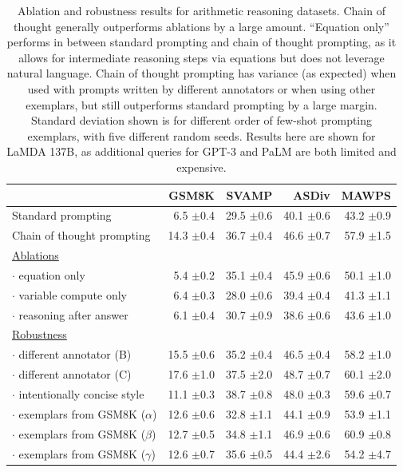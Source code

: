 \documentclass[]{article}
\theoremstyle{plain}
\theoremstyle{definition}
\theoremstyle{remark}
\newcommand{\lamda}[0]{LaMDA}
\newcommand{\palm}[0]{PaLM}
\newcommand{\cell}[2]{#1{ \scriptsize $\pm$#2}}
\begin{document}
\clearpage
\begingroup
{}
\begin{table}[h]
    \centering
    \caption{
    Ablation and robustness results for arithmetic reasoning datasets.
    Chain of thought generally outperforms ablations by a large amount. ``Equation only'' performs in between standard prompting and chain of thought prompting, as it allows for intermediate reasoning steps via equations but does not leverage natural language.
    Chain of thought prompting has variance (as expected) when used with prompts written by different annotators or when using other exemplars, but still outperforms standard prompting by a large margin.
    Standard deviation shown is for different order of few-shot prompting exemplars, with five different random seeds.
    Results here are shown for \lamda{} 137B, as additional queries for GPT-3 and \palm{} are both limited and expensive.
    }
    \begin{tabular}{l rrrr}
        \toprule
           & GSM8K & SVAMP & ASDiv & MAWPS \\
          \midrule 
          Standard prompting & \cell{6.5}{0.4} & \cell{29.5}{0.6} & \cell{40.1}{0.6} & \cell{43.2}{0.9} \\ \vspace{3mm}
          Chain of thought prompting & \cell{14.3}{0.4} & \cell{36.7}{0.4} & \cell{46.6}{0.7} & \cell{57.9}{1.5} \\
          \underline{Ablations} \\
          $\cdot$ equation only & \cell{5.4}{0.2} & \cell{35.1}{0.4} & \cell{45.9}{0.6} & \cell{50.1}{1.0} \\
          $\cdot$ variable compute only & \cell{6.4}{0.3} & \cell{28.0}{0.6} & \cell{39.4}{0.4} & \cell{41.3}{1.1} \\ \vspace{3mm}
          $\cdot$ reasoning after answer & \cell{6.1}{0.4} & \cell{30.7}{0.9} & \cell{38.6}{0.6} & \cell{43.6}{1.0} \\
          \underline{Robustness} \\
          $\cdot$ different annotator (B) & \cell{15.5}{0.6} & \cell{35.2}{0.4} & \cell{46.5}{0.4} & \cell{58.2}{1.0} \\
          $\cdot$ different annotator (C) & \cell{17.6}{1.0} & \cell{37.5}{2.0} & \cell{48.7}{0.7} & \cell{60.1}{2.0} \\
          $\cdot$ intentionally concise style & \cell{11.1}{0.3} & \cell{38.7}{0.8} & \cell{48.0}{0.3} & \cell{59.6}{0.7} \\
          $\cdot$ exemplars from GSM8K ($\alpha$) & \cell{12.6}{0.6} & \cell{32.8}{1.1} & \cell{44.1}{0.9} & \cell{53.9}{1.1} \\
          $\cdot$ exemplars from GSM8K ($\beta$) & \cell{12.7}{0.5} & \cell{34.8}{1.1} & \cell{46.9}{0.6} & \cell{60.9}{0.8} \\
          $\cdot$ exemplars from GSM8K ($\gamma$) & \cell{12.6}{0.7} & \cell{35.6}{0.5} & \cell{44.4}{2.6} & \cell{54.2}{4.7} \\
         \bottomrule
    \end{tabular}
    \label{tab:ablations-arithmetic}
\end{table}
\endgroup
\end{document}

